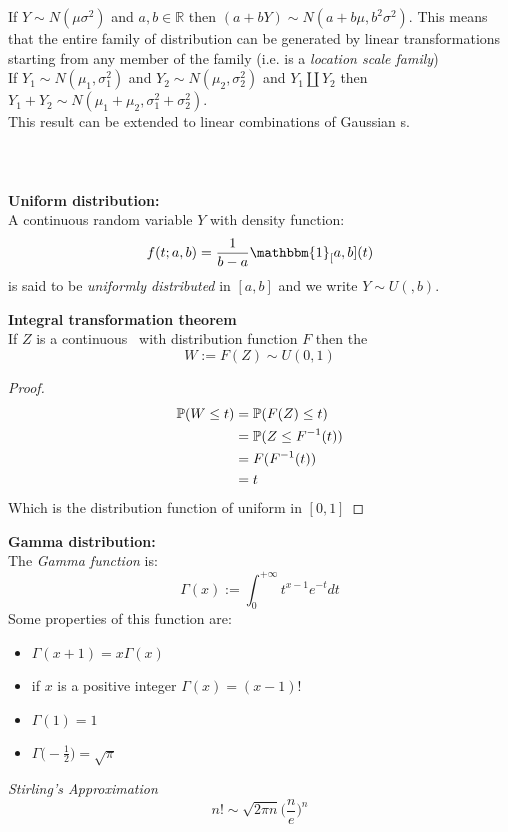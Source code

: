 If $Y\sim N(\mu \sigma ^2)$ and $a,b \in \mathbb{R}$ then $(a+bY) \sim N (a+b\mu, b^2 \sigma ^2)$. This means that the entire family of distribution can be generated by linear transformations starting from any member of the family (i.e. is a \textit{location scale family})\\


If $Y_1 \sim N( \mu_1 , \sigma_1^2)$ and $Y_2 \sim N( \mu_2 , \sigma_2^2)$ and $ Y_1 \amalg Y_2$ then $Y_1+Y_2 \sim N (\mu _1 + \mu_2 , \sigma_1^2 + \sigma_2^2)$.\\
This result can be extended to linear combinations of Gaussian \rv s.\\
\\
\\
\\
\textbf{Uniform distribution:}\\
A continuous random variable $Y$ with density function:
$$f(t;a,b)=\frac{1}{b-a} \mathbbm{1}_[a,b](t)$$
is said to be \textit{uniformly distributed} in $[a,b]$ and we write $Y\sim U(,b)$.\\
\begin{teo}\textbf{Integral transformation theorem}\\
If $Z$ is a continuous \rv \  with distribution function $F$ then the \rv 
$$W:=F(Z) \sim U(0,1)$$
\end{teo}
\begin{proof}
	\[
	\begin{split}
	\mathbb{P}(W\leq t)
	&=\mathbb{P} (F(Z)\leq t)\\
	&=\mathbb{P} (Z\leq F^{-1}(t))\\
	&=F(F^{-1}(t))\\
	&=t
	\end{split}
	\]
	Which is the distribution function of uniform in $[0,1]$
	
\end{proof}
\textbf{Gamma distribution:}\\
The \textit{Gamma function} is:
$$\Gamma (x):= \int_{0}^{+ \infty}t^{x-1}e^{-t}dt$$
Some properties of this function are:
\begin{itemize}
	\item $\Gamma (x+1)= x \Gamma(x)$
	\item if $x$ is a positive integer $\Gamma(x)=(x-1)!$
	\item $\Gamma(1)=1$
	\item $\Gamma \bigg( -\frac{1}{2} \bigg)=\sqrt{\pi}$
\end{itemize}
\textit{Stirling's Approximation}
$$n!\sim \sqrt{2\pi n}\bigg(\frac{n}{e} \bigg)^n$$

